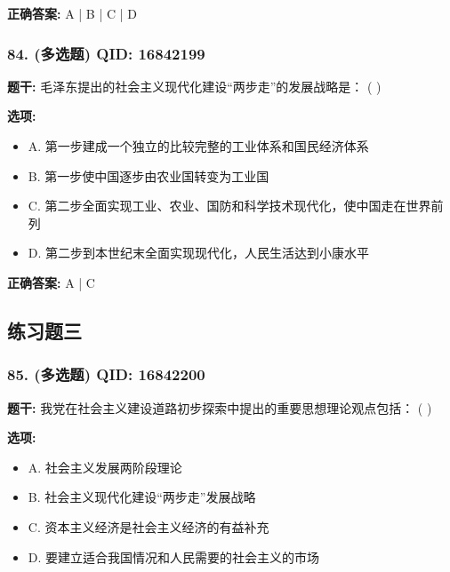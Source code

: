 \documentclass[12pt,UTF8]{ctexart}
\begin{document}
\textbf{正确答案:}
A | B | C | D

\vspace{0.3em}\hrulefill\vspace{0.7em}

\subsubsection*{84. (多选题) \small QID: 16842199}

\textbf{题干:}
毛泽东提出的社会主义现代化建设“两步走”的发展战略是： ( )

\textbf{选项:}
\begin{itemize}[leftmargin=*]

  \item A. 第一步建成一个独立的比较完整的工业体系和国民经济体系

  \item B. 第一步使中国逐步由农业国转变为工业国

  \item C. 第二步全面实现工业、农业、国防和科学技术现代化，使中国走在世界前列

  \item D. 第二步到本世纪末全面实现现代化，人民生活达到小康水平

\end{itemize}

\textbf{正确答案:}
A | C

\vspace{0.3em}\hrulefill\vspace{0.7em}

\subsection*{练习题三}

\subsubsection*{85. (多选题) \small QID: 16842200}

\textbf{题干:}
我党在社会主义建设道路初步探索中提出的重要思想理论观点包括： ( )

\textbf{选项:}
\begin{itemize}[leftmargin=*]

  \item A. 社会主义发展两阶段理论

  \item B. 社会主义现代化建设“两步走”发展战略

  \item C. 资本主义经济是社会主义经济的有益补充

  \item D. 要建立适合我国情况和人民需要的社会主义的市场

\end{itemize}
\end{document}
